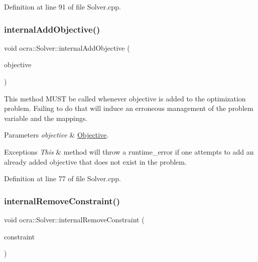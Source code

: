 Definition at line 91 of file Solver.\+cpp.

\hypertarget{classocra_1_1Solver_a451bb1506e4bb0423cddee847e4134e9}{}\label{classocra_1_1Solver_a451bb1506e4bb0423cddee847e4134e9} 
\subsubsection{\texorpdfstring{internal\+Add\+Objective()}{internalAddObjective()}}
{\footnotesize\ttfamily void ocra\+::\+Solver\+::internal\+Add\+Objective (\begin{DoxyParamCaption}\item[{const \hyperlink{namespaceocra_a37a91885f4fa5c523d22cb15d5673062}{Generic\+Objective} \&}]{objective }\end{DoxyParamCaption})\hspace{0.3cm}{\ttfamily [protected]}}

This method M\+U\+ST be called whenever objective is added to the optimization problem. Failing to do that will induce an erroneous management of the problem variable and the mappings.


\begin{DoxyParams}{Parameters}
{\em objective} & \hyperlink{classocra_1_1Objective}{Objective}. \\
\hline
\end{DoxyParams}

\begin{DoxyExceptions}{Exceptions}
{\em This} & method will throw a runtime\+\_\+error if one attempts to add an already added objective that does not exist in the problem. \\
\hline
\end{DoxyExceptions}


Definition at line 77 of file Solver.\+cpp.

\hypertarget{classocra_1_1Solver_a9f8e8e482b24a6eb6e54e912335b1145}{}\label{classocra_1_1Solver_a9f8e8e482b24a6eb6e54e912335b1145} 
\subsubsection{\texorpdfstring{internal\+Remove\+Constraint()}{internalRemoveConstraint()}}
{\footnotesize\ttfamily void ocra\+::\+Solver\+::internal\+Remove\+Constraint (\begin{DoxyParamCaption}\item[{const \hyperlink{namespaceocra_af10341108ce661566aad00908668e2b1}{Generic\+Constraint} \&}]{constraint }\end{DoxyParamCaption})\hspace{0.3cm}{\ttfamily [protected]}}

